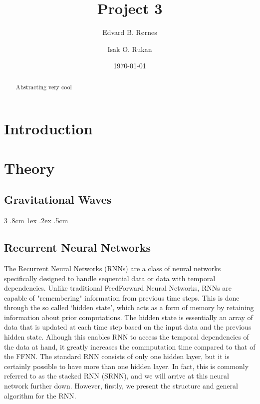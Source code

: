 \documentclass[%
reprint,
amsmath,amssymb,
aps,
]{revtex4-2}
\makeatletter
\renewcommand{\subsubsection}{%
	\@startsection
	{subsubsection}%
	{3}%
	{\z@}%
	{.8cm \@plus1ex \@minus .2ex}%
	{.5cm}%
	{\normalfont\small\centering}%
}
\makeatother
\begin{document}
	
\title{Project 3}
\author{Edvard B. Rørnes}
\author{Isak O. Rukan}
\date{\today}

\begin{abstract}
	Abstracting very cool
\end{abstract}

\maketitle
\tableofcontents

\section{Introduction}


\section{Theory}
\subsection{Gravitational Waves}
\subsubsection{}

\subsection{Recurrent Neural Networks}
The Recurrent Neural Networks (RNNs) are a class of neural networks specifically designed to handle sequential data or data with temporal dependencies. Unlike traditional FeedForward Neural Networks, RNNs are capable of "remembering" information from previous time steps. This is done through the so called `hidden state', which acts as a form of memory by retaining information about prior computations. The hidden state is essentially an array of data that is updated at each time step based on the input data and the previous hidden state. Alhough this enables RNN to access the temporal dependencies of the data at hand, it greatly increases the commputation time compared to that of the FFNN. The standard RNN consists of only one hidden layer, but it is certainly possible to have more than one hidden layer. In fact, this is commonly referred to as the stacked RNN (SRNN), and we will arrive at this neural network further down. However, firstly, we present the structure and general algorithm for the RNN.
\end{document}
